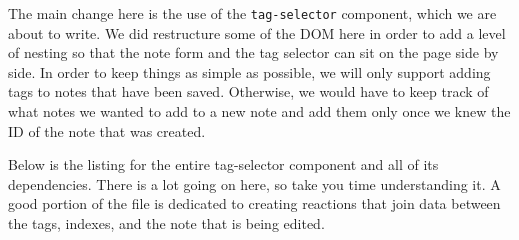 \documentclass[10pt,twoside,openright]{memoir}
\begin{document}
The main change here is the use of the \texttt{tag-selector} component,
which we are about to write. We did restructure some of the DOM here in
order to add a level of nesting so that the note form and the tag
selector can sit on the page side by side. In order to keep things as
simple as possible, we will only support adding tags to notes that have
been saved. Otherwise, we would have to keep track of what notes we
wanted to add to a new note and add them only once we knew the ID of the
note that was created.

Below is the listing for the entire tag-selector component and all of
its dependencies. There is a lot going on here, so take you time
understanding it. A good portion of the file is dedicated to creating
reactions that join data between the tags, indexes, and the note that is
being edited.
\end{document}
